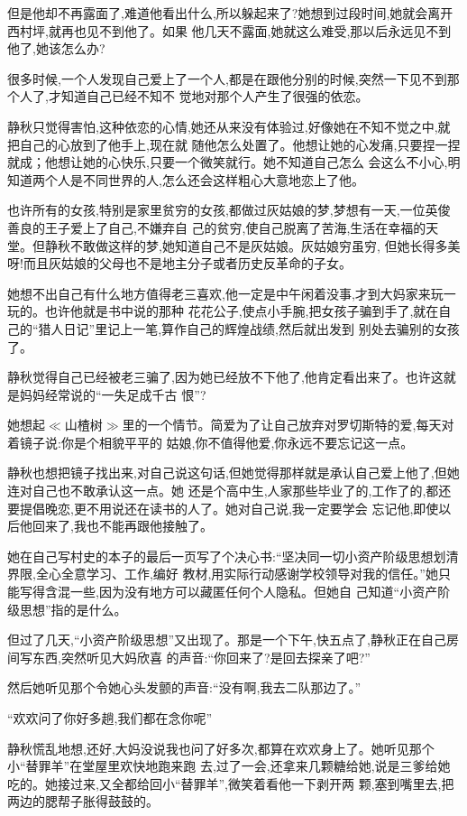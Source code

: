 ﻿\documentclass[12pt]{article}
\begin{document}
但是他却不再露面了,难道他看出什么,所以躲起来了?她想到过段时间,她就会离开西村坪,就再也见不到他了。如果
他几天不露面,她就这么难受,那以后永远见不到他了,她该怎么办?

很多时候,一个人发现自己爱上了一个人,都是在跟他分别的时候,突然一下见不到那个人了,才知道自己已经不知不
觉地对那个人产生了很强的依恋。

静秋只觉得害怕,这种依恋的心情,她还从来没有体验过,好像她在不知不觉之中,就把自己的心放到了他手上,现在就
随他怎么处置了。他想让她的心发痛,只要捏一捏就成；他想让她的心快乐,只要一个微笑就行。她不知道自己怎么
会这么不小心,明知道两个人是不同世界的人,怎么还会这样粗心大意地恋上了他。

也许所有的女孩,特别是家里贫穷的女孩,都做过灰姑娘的梦,梦想有一天,一位英俊善良的王子爱上了自己,不嫌弃自
己的贫穷,使自己脱离了苦海,生活在幸福的天堂。但静秋不敢做这样的梦,她知道自己不是灰姑娘。灰姑娘穷虽穷,
但她长得多美呀!而且灰姑娘的父母也不是地主分子或者历史反革命的子女。

她想不出自己有什么地方值得老三喜欢,他一定是中午闲着没事,才到大妈家来玩一玩的。也许他就是书中说的那种
花花公子,使点小手腕,把女孩子骗到手了,就在自己的``猎人日记''里记上一笔,算作自己的辉煌战绩,然后就出发到
别处去骗别的女孩了。

静秋觉得自己已经被老三骗了,因为她已经放不下他了,他肯定看出来了。也许这就是妈妈经常说的``一失足成千古
恨''?

她想起$\ll$山楂树$\gg$里的一个情节。简爱为了让自己放弃对罗切斯特的爱,每天对着镜子说:你是个相貌平平的
姑娘,你不值得他爱,你永远不要忘记这一点。

静秋也想把镜子找出来,对自己说这句话,但她觉得那样就是承认自己爱上他了,但她连对自己也不敢承认这一点。她
还是个高中生,人家那些毕业了的,工作了的,都还要提倡晚恋,更不用说还在读书的人了。她对自己说,我一定要学会
忘记他,即使以后他回来了,我也不能再跟他接触了。

她在自己写村史的本子的最后一页写了个决心书:``坚决同一切小资产阶级思想划清界限,全心全意学习、工作,编好
教材,用实际行动感谢学校领导对我的信任。''她只能写得含混一些,因为没有地方可以藏匿任何个人隐私。但她自
己知道``小资产阶级思想''指的是什么。

但过了几天,``小资产阶级思想''又出现了。那是一个下午,快五点了,静秋正在自己房间写东西,突然听见大妈欣喜
的声音:``你回来了?是回去探亲了吧?''

然后她听见那个令她心头发颤的声音:``没有啊,我去二队那边了。''

``欢欢问了你好多趟,我们都在念你呢\myrule ''

静秋慌乱地想,还好,大妈没说我也问了好多次,都算在欢欢身上了。她听见那个小``替罪羊''在堂屋里欢快地跑来跑
去,过了一会,还拿来几颗糖给她,说是三爹给她吃的。她接过来,又全都给回小``替罪羊'',微笑着看他一下剥开两
颗,塞到嘴里去,把两边的腮帮子胀得鼓鼓的。
\end{document}
